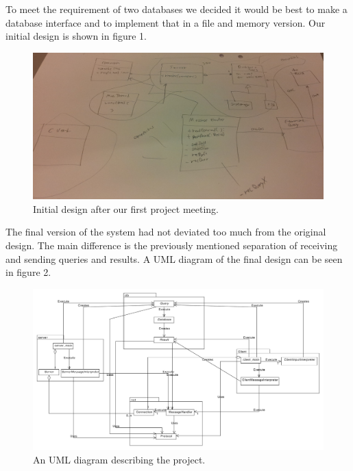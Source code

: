 \documentclass[10pt, a4paper]{article}
\begin{document}
To meet the requirement of two databases we decided it would be best to make a database interface and to implement that in a file and memory version. Our initial design is shown in figure 1.

\begin{figure}[hbt]
\begin{center}
\includegraphics[scale=0.38]{img/uml_blueprint.png}
\end{center}
\label{init+design}
\caption{Initial design after our first project meeting.}
\end{figure}

The final version of the system had not deviated too much from the original design. The main difference is the previously mentioned separation of receiving and sending queries and results. A UML diagram of the final design can be seen in figure 2.

\begin{figure}[hbt]
\begin{center}
\includegraphics[scale=0.3]{img/uml.pdf}
\end{center}
\label{UML}
\caption{An UML diagram describing the project.}
\end{figure}
\end{document}
